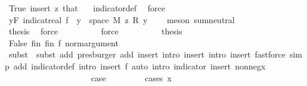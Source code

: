 \begin{isabellebody}
\ True\ insert\ z\ that\ {}\ \isamarkupfalse%
\ indicator{\isacharunderscore}{\kern0pt}def\ \isamarkupfalse%
\ force\isanewline
\ \ \ \ \ \ \ \ \ \ \isamarkupfalse%
\ {\isachardoublequoteopen}{\isacharparenleft}{\kern0pt}{\isasymSum}y{\isasymin}F{\isachardot}{\kern0pt}\ indicat{\isacharunderscore}{\kern0pt}real\ {\isacharparenleft}{\kern0pt}f\ {\isacharminus}{\kern0pt}{\isacharbackquote}{\kern0pt}\ {\isacharbraceleft}{\kern0pt}y{\isacharbraceright}{\kern0pt}\ {\isasyminter}\ space\ M{\isacharparenright}{\kern0pt}\ z\ {\isacharasterisk}{\kern0pt}\isactrlsub R\ y{\isacharparenright}{\kern0pt}\ {\isacharequal}{\kern0pt}\ {}{\isachardoublequoteclose}\ \isamarkupfalse%
\ {\isacharparenleft}{\kern0pt}meson\ sum{\isachardot}{\kern0pt}neutral{\isacharparenright}{\kern0pt}\isanewline
\ \ \ \ \ \ \ \ \ \ \isamarkupfalse%
\ {\isacharquery}{\kern0pt}thesis\ \isamarkupfalse%
\ force\isanewline
\ \ \ \ \ \ \ \ \isamarkupfalse%
\ {\isacharparenleft}{\kern0pt}force{\isacharparenright}{\kern0pt}\isanewline
\ \ \ \ \ \ \ \ \isamarkupfalse%
\ {\isacharquery}{\kern0pt}thesis\ \isamarkupfalse%
\ False\ fin{\isacharunderscore}{\kern0pt}{}\ fin{\isacharunderscore}{\kern0pt}{}\ f\ norm{\isacharunderscore}{\kern0pt}argument\ \isamarkupfalse%
\ {\isacharparenleft}{\kern0pt}subst\ {\isacharasterisk}{\kern0pt}{\isacharcomma}{\kern0pt}\ subst\ add{\isacharcomma}{\kern0pt}\ presburger\ add{\isacharcolon}{\kern0pt}\ insert{\isacharcomma}{\kern0pt}\ intro\ insert{\isacharcomma}{\kern0pt}\ intro\ insert{\isacharcomma}{\kern0pt}\ fastforce\ simp\ add{\isacharcolon}{\kern0pt}\ indicator{\isacharunderscore}{\kern0pt}def\ intro{\isacharbang}{\kern0pt}{\isacharcolon}{\kern0pt}\ insert{\isacharparenleft}{\kern0pt}{}{\isacharparenright}{\kern0pt}\ f{\isacharparenleft}{\kern0pt}{}{\isacharparenright}{\kern0pt}{\isacharcomma}{\kern0pt}\ auto\ intro{\isacharbang}{\kern0pt}{\isacharcolon}{\kern0pt}\ indicator\ insert\ nonneg{\isacharunderscore}{\kern0pt}x{\isacharparenright}{\kern0pt}\isanewline
\ \ \ \ \ \ \isamarkupfalse%
\ \isanewline
\ \ \ \ \isamarkupfalse%
\isanewline
\ \ \ \ \ \ \isamarkupfalse%
\ {}\isanewline
\ \ \ \ \ \ \isamarkupfalse%
\ {\isacharquery}{\kern0pt}case\ \isanewline
\ \ \ \ \ \ \isamarkupfalse%
\ {\isacharparenleft}{\kern0pt}cases\ {\isachardoublequoteopen}x\ {\isacharequal}{\kern0pt}\ {}{\isachardoublequoteclose}{\isacharparenright}{\kern0pt}\isanewline

\end{isabellebody}
